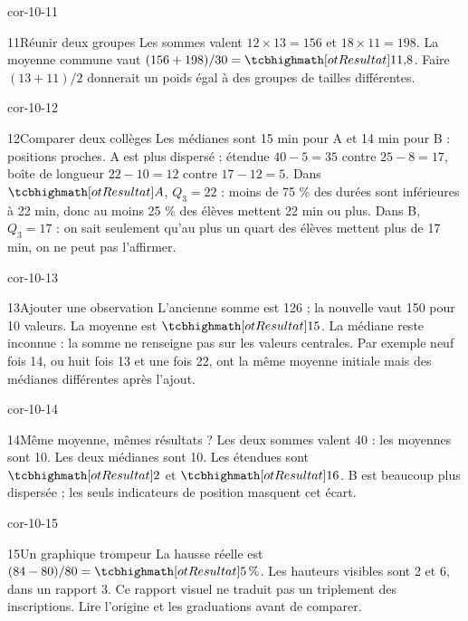 \begin{blocLivre}{cor-10-11}\begin{corrige}{11}{Réunir deux groupes}
Les sommes valent $12\times13=156$ et $18\times11=198$. La moyenne commune vaut $(156+198)/30=\res{11{,}8}$. Faire $(13+11)/2$ donnerait un poids égal à des groupes de tailles différentes.
\end{corrige}\end{blocLivre}
\begin{blocLivre}{cor-10-12}\begin{corrige}{12}{Comparer deux collèges}
Les médianes sont 15 min pour A et 14 min pour B : positions proches. A est plus dispersé : étendue $40-5=35$ contre $25-8=17$, boîte de longueur $22-10=12$ contre $17-12=5$. Dans $\res{A}$, $Q_3=22$ : moins de 75 \% des durées sont inférieures à 22 min, donc au moins 25 \% des élèves mettent 22 min ou plus. Dans B, $Q_3=17$ : on sait seulement qu’au plus un quart des élèves mettent plus de 17 min, on ne peut pas l’affirmer.
\label{fig-cor-10-12}
\end{corrige}\end{blocLivre}
\begin{blocLivre}{cor-10-13}\begin{corrige}{13}{Ajouter une observation}
L’ancienne somme est 126 ; la nouvelle vaut 150 pour 10 valeurs. La moyenne est $\res{15}$. La médiane reste inconnue : la somme ne renseigne pas sur les valeurs centrales. Par exemple neuf fois 14, ou huit fois 13 et une fois 22, ont la même moyenne initiale mais des médianes différentes après l’ajout.
\end{corrige}\end{blocLivre}
\begin{blocLivre}{cor-10-14}\begin{corrige}{14}{Même moyenne, mêmes résultats ?}
Les deux sommes valent 40 : les moyennes sont 10. Les deux médianes sont 10. Les étendues sont $\res2$ et $\res{16}$. B est beaucoup plus dispersée ; les seuls indicateurs de position masquent cet écart.
\end{corrige}\end{blocLivre}
\begin{blocLivre}{cor-10-15}\begin{corrige}{15}{Un graphique trompeur}
La hausse réelle est $(84-80)/80=\res{5\,\%}$. Les hauteurs visibles sont 2 et 6, dans un rapport 3. Ce rapport visuel ne traduit pas un triplement des inscriptions. Lire l’origine et les graduations avant de comparer.
\label{fig-cor-10-15}
\end{corrige}\end{blocLivre}
